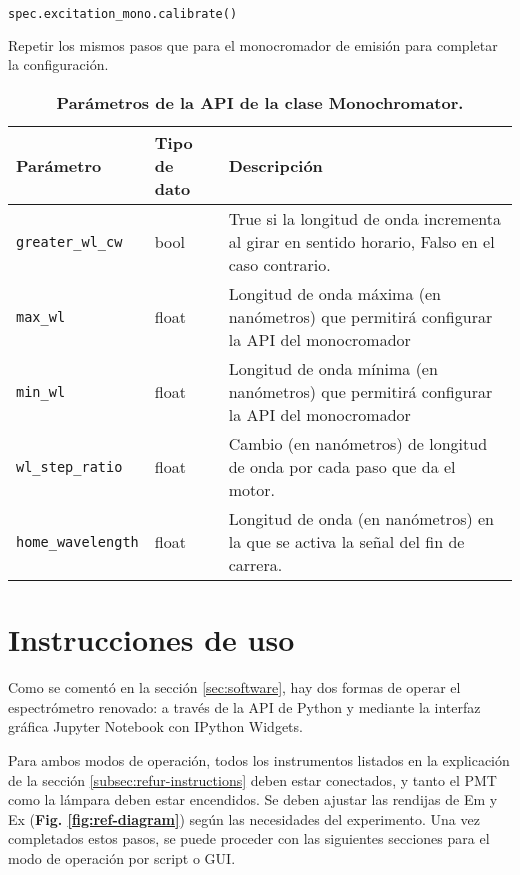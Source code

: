 \begin{lstlisting}[language=Python]
spec.excitation_mono.calibrate()
\end{lstlisting}

Repetir los mismos pasos que para el monocromador de emisión para completar la configuración.

\begin{table}[h]
 \centering
 \begin{tabular}{|l|l|p{10cm}|}
    \hline
    \textbf{Parámetro} & \textbf{Tipo de dato} & \textbf{Descripción} \\ \hline
    \texttt{greater\_wl\_cw}          & bool               & True si la longitud de onda incrementa al girar en sentido horario, Falso en el caso contrario. \\ \hline
    \texttt{max\_wl}                 & float              & Longitud de onda máxima (en nanómetros) que permitirá configurar la API del monocromador \\ \hline
    \texttt{min\_wl}                 & float              & Longitud de onda mínima (en nanómetros) que permitirá configurar la API del monocromador \\ \hline
    \texttt{wl\_step\_ratio}          & float              & Cambio (en nanómetros) de longitud de onda por cada paso que da el motor.\\ \hline
    \texttt{home\_wavelength}        & float              & Longitud de onda (en nanómetros) en la que se activa la señal del fin de carrera. \\ \hline
\end{tabular}
\caption{\textbf{Parámetros de la API de la clase Monochromator.}}
\label{tab:monochromator_api_parameters}
\end{table}

\section{Instrucciones de uso} \label{apendice:instrucciones_uso}

Como se comentó en la sección \ref{sec:software}, hay dos formas de operar el espectrómetro renovado: a través de la API de Python y mediante la interfaz gráfica Jupyter Notebook con IPython Widgets. 

Para ambos modos de operación, todos los instrumentos listados en la explicación de la sección \ref{subsec:refur-instructions} deben estar conectados, y tanto el PMT como la lámpara deben estar encendidos. 
Se deben ajustar las rendijas de Em y Ex (\textbf{Fig. \ref{fig:ref-diagram}}) según las necesidades del experimento. 
Una vez completados estos pasos, se puede proceder con las siguientes secciones para el modo de operación por script o GUI.

